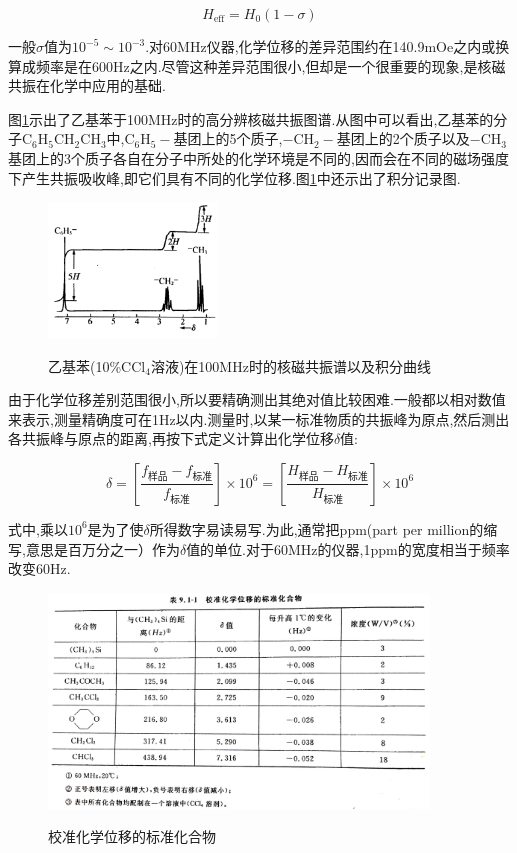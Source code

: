 \documentclass[a4paper]{article}
\begin{document}
\begin{equation}H_\text{eff}=H_0(1-\sigma)\label{9.1-15}\end{equation}

一般$\sigma$值为$10^{-5}\sim10^{-3}$.对60MHz仪器,化学位移的差异范围约在140.9mOe之内或换算成频率是在600Hz之内.尽管这种差异范围很小,但却是一个很重要的现象,是核磁共振在化学中应用的基础.

图\ref{Fig3}示出了乙基苯于100MHz时的高分辨核磁共振图谱.从图中可以看出,乙基苯的分子$\text{C}_6\text{H}_5\text{C}\text{H}_2\text{C}\text{H}_3$中,$\text{C}_6\text{H}_5-$基团上的5个质子,$-\text{C}\text{H}_2-$基团上的2个质子以及$-\text{C}\text{H}_3$基团上的3个质子各自在分子中所处的化学环境是不同的,因而会在不同的磁场强度下产生共振吸收峰,即它们具有不同的化学位移.图\ref{Fig3}中还示出了积分记录图.

\begin{figure}[H]
\centering
\includegraphics[width = 0.4\textwidth]{fig/3.png}\\
\caption{乙基苯(10\%CCl$_4$溶液)在100MHz时的核磁共振谱以及积分曲线}
\label{Fig3}
\end{figure}

由于化学位移差别范围很小,所以要精确测出其绝对值比较困难.一般都以相对数值来表示,测量精确度可在1Hz以内.测量时,以某一标准物质的共振峰为原点,然后测出各共振峰与原点的距离,再按下式定义计算出化学位移$\delta$值:

\begin{equation}\delta=\left[\frac{f_\text{样品}-f_\text{标准}}{f_\text{标准}}\right]\times 10^6=\left[\frac{H_\text{样品}-H_\text{标准}}{H_\text{标准}}\right]\times 10^6\end{equation}

式中,乘以$10^6$是为了使$\delta$所得数字易读易写.为此,通常把ppm(part per million的缩写,意思是百万分之一）作为$\delta$值的单位.对于60MHz的仪器,1ppm的宽度相当于频率改变60Hz.

\begin{figure}[H]
\centering
\includegraphics[width = 0.9\textwidth]{fig/4.png}\\
\caption{校准化学位移的标准化合物}
\label{Tab1}
\end{figure}
\end{document}
